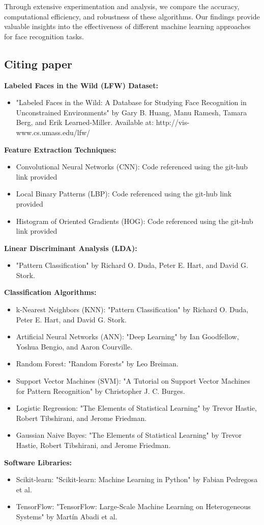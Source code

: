 \documentclass[a4paper]{article}
\theoremstyle{plain}
\theoremstyle{definition}
\begin{document}
Through extensive experimentation and analysis, we compare the accuracy, computational efficiency, and robustness of these algorithms. Our findings provide valuable insights into the effectiveness of different machine learning approaches for face recognition tasks.\vspace{8pt}
	
	\subsection{Citing paper}
	\textbf{Labeled Faces in the Wild (LFW) Dataset:}
 
 \begin{itemize}
\item "Labeled Faces in the Wild: A Database for Studying Face Recognition in Unconstrained Environments" by Gary B. Huang, Manu Ramesh, Tamara Berg, and Erik Learned-Miller. Available at: http://vis-www.cs.umass.edu/lfw/  
\end{itemize}
\textbf{Feature Extraction Techniques:}
\begin{itemize}
\item Convolutional Neural Networks (CNN): Code referenced using the git-hub link provided
\item Local Binary Patterns (LBP): Code referenced using the git-hub link provided
\item Histogram of Oriented Gradients (HOG): Code referenced using the git-hub link provided
\end{itemize}
\textbf{Linear Discriminant Analysis (LDA):}
\begin{itemize}
\item "Pattern Classification" by Richard O. Duda, Peter E. Hart, and David G. Stork.
\end{itemize}
\textbf{Classification Algorithms:}
\begin{itemize}
\item k-Nearest Neighbors (KNN): "Pattern Classification" by Richard O. Duda, Peter E. Hart, and David G. Stork.
\item Artificial Neural Networks (ANN): "Deep Learning" by Ian Goodfellow, Yoshua Bengio, and Aaron Courville.
\item Random Forest: "Random Forests" by Leo Breiman.
\item Support Vector Machines (SVM): "A Tutorial on Support Vector Machines for Pattern Recognition" by Christopher J. C. Burges.
\item Logistic Regression: "The Elements of Statistical Learning" by Trevor Hastie, Robert Tibshirani, and Jerome Friedman.
\item Gaussian Naive Bayes: "The Elements of Statistical Learning" by Trevor Hastie, Robert Tibshirani, and Jerome Friedman.
\end{itemize}
\textbf{Software Libraries:}
\begin{itemize}
\item Scikit-learn: "Scikit-learn: Machine Learning in Python" by Fabian Pedregosa et al.
\item TensorFlow: "TensorFlow: Large-Scale Machine Learning on Heterogeneous Systems" by Martín Abadi et al.
\end{itemize}
\end{document}
